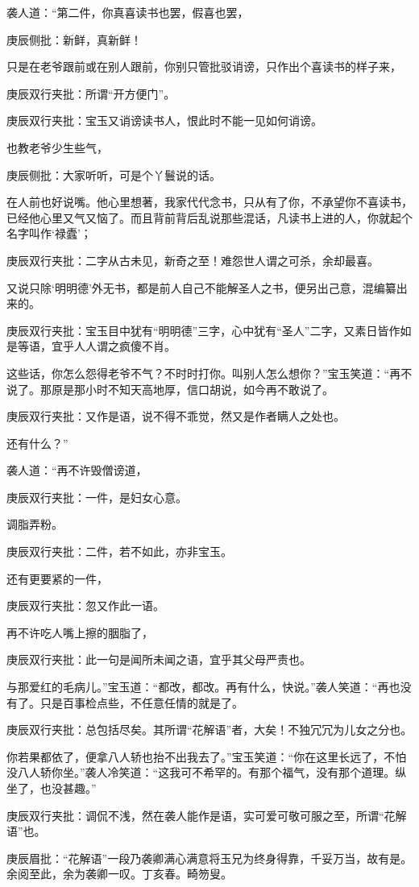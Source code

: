\begin{parag}
    袭人道：“第二件，你真喜读书也罢，假喜也罢，\begin{note}庚辰侧批：新鲜，真新鲜！\end{note}只是在老爷跟前或在别人跟前，你别只管批驳诮谤，只作出个喜读书的样子来，\begin{note}庚辰双行夹批：所谓“开方便门”。\end{note}\begin{note}庚辰双行夹批：宝玉又诮谤读书人，恨此时不能一见如何诮谤。\end{note}也教老爷少生些气，\begin{note}庚辰侧批：大家听听，可是个丫鬟说的话。\end{note}在人前也好说嘴。他心里想著，我家代代念书，只从有了你，不承望你不喜读书，已经他心里又气又恼了。而且背前背后乱说那些混话，凡读书上进的人，你就起个名字叫作‘禄蠹’；\begin{note}庚辰双行夹批：二字从古未见，新奇之至！难怨世人谓之可杀，余却最喜。\end{note}又说只除‘明明德’外无书，都是前人自己不能解圣人之书，便另出己意，混编纂出来的。\begin{note}庚辰双行夹批：宝玉目中犹有“明明德”三字，心中犹有“圣人”二字，又素日皆作如是等语，宜乎人人谓之疯傻不肖。\end{note}这些话，你怎么怨得老爷不气？不时时打你。叫别人怎么想你？”宝玉笑道：“再不说了。那原是那小时不知天高地厚，信口胡说，如今再不敢说了。\begin{note}庚辰双行夹批：又作是语，说不得不乖觉，然又是作者瞒人之处也。\end{note}还有什么？”
\end{parag}


\begin{parag}
    袭人道：“再不许毁僧谤道，\begin{note}庚辰双行夹批：一件，是妇女心意。\end{note}调脂弄粉。\begin{note}庚辰双行夹批：二件，若不如此，亦非宝玉。\end{note}还有更要紧的一件，\begin{note}庚辰双行夹批：忽又作此一语。\end{note}再不许吃人嘴上擦的胭脂了，\begin{note}庚辰双行夹批：此一句是闻所未闻之语，宜乎其父母严责也。\end{note}与那爱红的毛病儿。”宝玉道：“都改，都改。再有什么，快说。”袭人笑道：“再也没有了。只是百事检点些，不任意任情的就是了。\begin{note}庚辰双行夹批：总包括尽矣。其所谓“花解语”者，大矣！不独冗冗为儿女之分也。\end{note}你若果都依了，便拿八人轿也抬不出我去了。”宝玉笑道：“你在这里长远了，不怕没八人轿你坐。”袭人冷笑道：“这我可不希罕的。有那个福气，没有那个道理。纵坐了，也没甚趣。”\begin{note}庚辰双行夹批：调侃不浅，然在袭人能作是语，实可爱可敬可服之至，所谓“花解语”也。\end{note}\begin{note}庚辰眉批：“花解语”一段乃袭卿满心满意将玉兄为终身得靠，千妥万当，故有是。余阅至此，余为袭卿一叹。丁亥春。畸笏叟。\end{note}
\end{parag}


